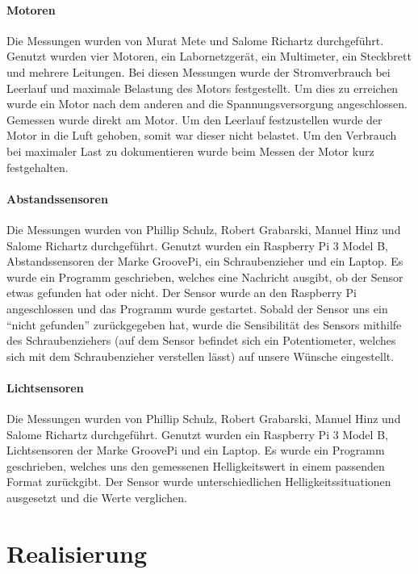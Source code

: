 \documentclass[notitlepage]{report}
\begin{document}
\subsubsection{Motoren}

Die Messungen wurden von Murat Mete und Salome Richartz durchgef\"{u}hrt. Genutzt wurden vier Motoren, ein Labornetzger\"{a}t, ein Multimeter, ein Steckbrett und mehrere Leitungen. Bei diesen Messungen wurde der Stromverbrauch bei Leerlauf und maximale Belastung des Motors festgestellt. Um dies zu erreichen wurde ein Motor nach dem anderen and die Spannungsversorgung angeschlossen. Gemessen wurde direkt am Motor. Um den Leerlauf festzustellen wurde der Motor in die Luft gehoben, somit war dieser nicht belastet. Um den Verbrauch bei maximaler Last zu dokumentieren wurde beim Messen der Motor kurz festgehalten.

\subsubsection{Abstandssensoren}

Die Messungen wurden von Phillip Schulz, Robert Grabarski, Manuel Hinz und Salome Richartz durchgef\"{u}hrt. Genutzt wurden ein Raspberry Pi 3 Model B, Abstandssensoren der Marke GroovePi, ein Schraubenzieher und ein Laptop. Es wurde ein Programm geschrieben, welches eine Nachricht ausgibt, ob der Sensor etwas gefunden hat oder nicht. Der Sensor wurde an den Raspberry Pi angeschlossen und das Programm wurde gestartet. Sobald der  Sensor uns ein “nicht gefunden” zur\"{u}ckgegeben hat, wurde die Sensibilit\"{a}t des Sensors mithilfe des Schraubenziehers (auf dem Sensor befindet sich ein Potentiometer, welches sich mit dem Schraubenzieher verstellen l\"{a}sst) auf unsere W\"{u}nsche eingestellt.

\subsubsection{Lichtsensoren}

Die Messungen wurden von Phillip Schulz, Robert Grabarski, Manuel Hinz und Salome Richartz durchgef\"{u}hrt. Genutzt wurden ein Raspberry Pi 3 Model B, Lichtsensoren der Marke GroovePi und ein Laptop. Es wurde ein Programm geschrieben, welches uns den gemessenen Helligkeitswert in einem passenden Format zur\"{u}ckgibt. Der Sensor wurde unterschiedlichen Helligkeitssituationen ausgesetzt und die Werte verglichen.


\chapter{Realisierung}
\end{document}
